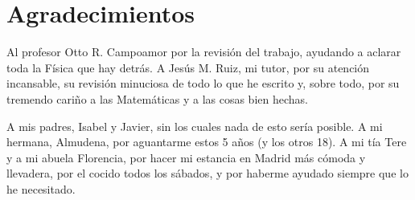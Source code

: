 \documentclass[11pt,a4paper,twoside]{book}
\begin{document}
\chapter*{Agradecimientos}

Al profesor Otto R. Campoamor por la revisión del trabajo, ayudando a aclarar toda la Física que hay detrás. 
A Jesús M. Ruiz, mi tutor, por su atención incansable, su revisión minuciosa de todo lo que he escrito y, sobre todo, por su tremendo cariño a las Matemáticas y a las cosas bien hechas.

A mis padres, Isabel y Javier, sin los cuales nada de esto sería posible.
A mi hermana, Almudena, por aguantarme estos 5 años (y los otros 18).
A mi tía Tere y a mi abuela Florencia, por hacer mi estancia en Madrid más cómoda y llevadera, por el cocido todos los sábados, y por haberme ayudado siempre que lo he necesitado. 
\end{document}
